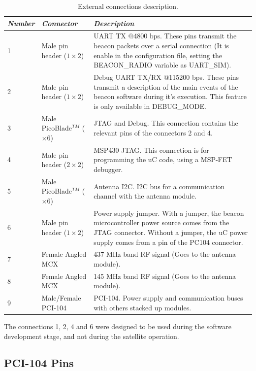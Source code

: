 \begin{table}[!h]
	\begin{center}
		\begin{tabular}{L{1.3cm} C{3cm} C{10cm}}
			\toprule[1.5pt]
			\textit{Number} & \textit{Connector} & \textit{Description} \\
			 & Male pin header ($1 \times 2$) & UART TX $@$4800 bps. These pins transmit the beacon packets over a serial connection (It is enable in the configuration file, setting the BEACON\_RADIO variable as UART\_SIM). \\
			2 & Male pin header ($1 \times 2$) & Debug UART TX/RX $@$115200 bps. These pins transmit a description of the main events of the beacon software during it's execution. This feature is only available in DEBUG\_MODE. \\
			3 & Male PicoBlade$^{TM}$ ($\times 6$) & JTAG and Debug. This connection contains the relevant pins of the connectors 2 and 4. \\
			4 & Male pin header ($2 \times 2$) & MSP430 JTAG. This connection is for programming the uC code, using a MSP-FET debugger. \\
			5 & Male PicoBlade$^{TM}$ ($\times 6$) & Antenna I2C. I2C bus for a communication channel with the antenna module. \\
			6 & Male pin header ($1 \times 2$) & Power supply jumper. With a jumper, the beacon microcontroller power source comes from the JTAG connector. Without a jumper, the uC power supply comes from a pin of the PC104 connector. \\
			7 & Female Angled MCX & 437 MHz band RF signal (Goes to the antenna module). \\
			8 & Female Angled MCX & 145 MHz band RF signal (Goes to the antenna module). \\
			9 & Male/Female PCI-104 & PCI-104. Power supply and communication buses with others stacked up modules. \\
			\bottomrule[1.5pt]
		\end{tabular}
		\caption{External connections description.}
		\label{tab:connections-ref}
	\end{center}
\end{table}

The connections 1, 2, 4 and 6 were designed to be used during the software development stage, and not during the satellite operation.

\subsection{PCI-104 Pins}

